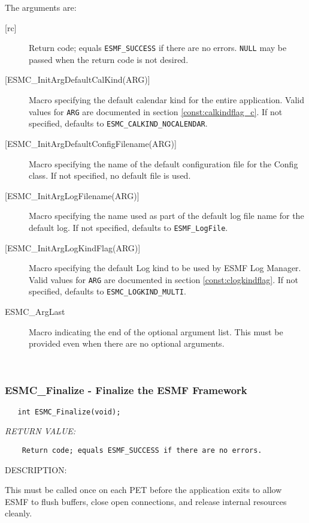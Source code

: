     The arguments are:
    \begin{description}
    \item [{[rc]}]
      Return code; equals {\tt ESMF\_SUCCESS} if there are no errors.
      {\tt NULL} may be passed when the return code is not desired.
    \item [{[ESMC\_InitArgDefaultCalKind(ARG)]}]
      Macro specifying the default calendar kind for the entire
      application.  Valid values for {\tt ARG} are documented in section
      \ref{const:calkindflag_c}.
      If not specified, defaults to {\tt ESMC\_CALKIND\_NOCALENDAR}.
    \item [{[ESMC\_InitArgDefaultConfigFilename(ARG)]}]
      Macro specifying the name of the default configuration file for the
      Config class.  If not specified, no default file is used.
    \item [{[ESMC\_InitArgLogFilename(ARG)]}]
      Macro specifying the name used as part of the default log file name for
      the default log.  If not specified, defaults to {\tt ESMF\_LogFile}.
    \item [{[ESMC\_InitArgLogKindFlag(ARG)]}]
      Macro specifying the default Log kind to be used by ESMF Log Manager.
      Valid values for {\tt ARG} are  documented in section
      \ref{const:clogkindflag}.
      If not specified, defaults to {\tt ESMC\_LOGKIND\_MULTI}.
    \item [ESMC\_ArgLast]
      Macro indicating the end of the optional argument list.  This must be
      provided even when there are no optional arguments.
    \end{description} 
 
\mbox{}\hrulefill\ 
 
\subsubsection [ESMC\_Finalize] {ESMC\_Finalize - Finalize the ESMF Framework}


  
\begin{verbatim}   int ESMC_Finalize(void);
 \end{verbatim}{\em RETURN VALUE:}
\begin{verbatim}    Return code; equals ESMF_SUCCESS if there are no errors.\end{verbatim}
{\sf DESCRIPTION:\\ }


   This must be called once on each PET before the application exits to
   allow ESMF to flush buffers, close open connections, and release
   internal resources cleanly.
\setlength{\parskip}{\oldparskip}
\setlength{\parindent}{\oldparindent}
\setlength{\baselineskip}{\oldbaselineskip}
